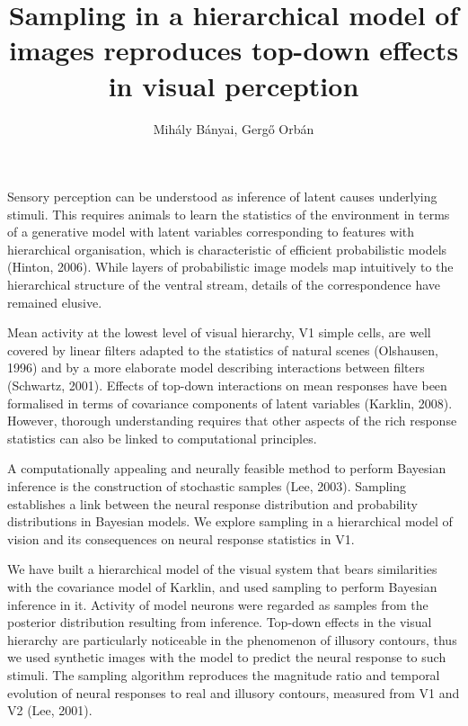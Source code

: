 \documentclass[12pt,a4paper]{article}
\date{}
\begin{document}
\makeatletter
\patchcmd{\@maketitle}{\LARGE \@title}{\fontsize{18}{19.2}\selectfont\@title}{}{}
\makeatother
\renewcommand\Authfont{\fontsize{12}{14.4}\selectfont}
\renewcommand\Affilfont{\fontsize{10}{10.8}\selectfont}


\title{Sampling in a hierarchical model of images reproduces top-down effects in visual perception}
\author{Mih\'aly B\'anyai, Gerg\H{o} Orb\'an}
\maketitle
\thispagestyle{empty}

Sensory perception can be understood as inference of latent causes underlying stimuli. This requires animals to learn the statistics of the environment in terms of a generative model with latent variables corresponding to features with hierarchical organisation, which is characteristic of efficient probabilistic models (Hinton, 2006). While layers of probabilistic image models map intuitively to the hierarchical structure of the ventral stream, details of the correspondence have remained elusive.

Mean activity at the lowest level of visual hierarchy, V1 simple cells, are well covered by linear filters adapted to the statistics of natural scenes (Olshausen, 1996) and by a more elaborate model describing interactions between filters (Schwartz, 2001). Effects of top-down interactions on mean responses have been formalised in terms of covariance components of latent variables (Karklin, 2008). However, thorough understanding requires that other aspects of the rich response statistics can also be linked to computational principles.

A computationally appealing and neurally feasible method to perform Bayesian inference is the construction of stochastic samples (Lee, 2003). Sampling establishes a link between the neural response distribution and probability distributions in Bayesian models. We explore sampling in a hierarchical model of vision and its consequences on neural response statistics in V1. 

We have built a hierarchical model of the visual system that bears similarities with the covariance model of Karklin, and used sampling to perform Bayesian inference in it. Activity of model neurons were regarded as samples from the posterior distribution resulting from inference. Top-down effects in the visual hierarchy are particularly noticeable in the phenomenon of illusory contours, thus we used synthetic images with the model to predict the neural response to such stimuli. The sampling algorithm reproduces the magnitude ratio and temporal evolution of neural responses to real and illusory contours, measured from V1 and V2 (Lee, 2001). 
\end{document}
